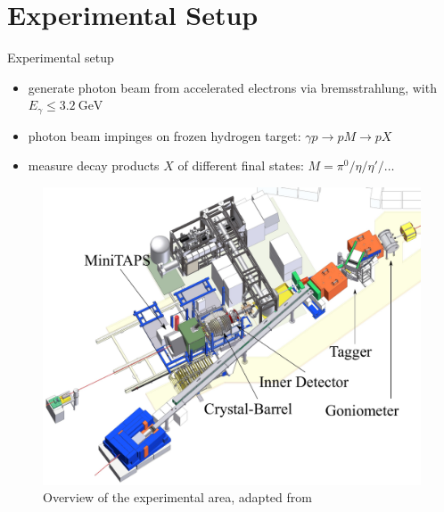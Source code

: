 \documentclass[11pt,aspectratio=169,dvipsnames]{beamer}
\begin{document}
\section{Experimental Setup}
\begin{frame}{Experimental setup}
	\begin{minipage}{.3\linewidth}
	{\small
			\begin{itemize}
			\item generate photon beam from accelerated electrons via bremsstrahlung, with $E_\gamma\leq\SI{3.2}{\giga\eV}$ 
			\item photon beam impinges on frozen hydrogen target: $\gamma p \to p M\to p X$
			\item measure decay products $X$ of different final states: $M=\pi^0/\eta/\eta'/\dots$
		\end{itemize}
	}
	\end{minipage}
	\begin{minipage}{.69\linewidth}
			\begin{figure}
			\centering
			\includegraphics[width=.9\linewidth]{CB-Area}
			\caption*{Overview of the experimental area, adapted from }
		\end{figure}
	\end{minipage}

\end{frame}
\end{document}
